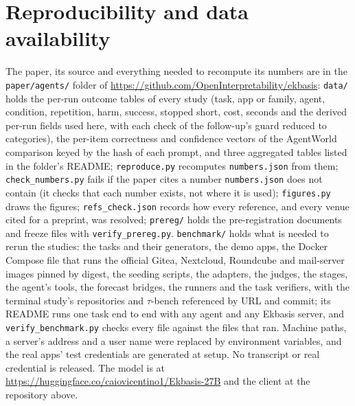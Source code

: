 \documentclass[11pt]{article}
\begin{document}
\section*{Reproducibility and data availability}
The paper, its source and everything needed to recompute its numbers are in the \texttt{paper/agents/} folder of
\url{https://github.com/OpenInterpretability/ekbasis}: \texttt{data/} holds the per-run outcome tables of every study
(task, app or family, agent, condition, repetition, harm, success, stopped short, cost, seconds and the derived per-run
fields used here, with each check of the follow-up's guard reduced to categories), the per-item correctness and
confidence vectors of the AgentWorld comparison keyed by the hash of each prompt, and three aggregated tables listed in
the folder's README; \texttt{reproduce.py} recomputes \texttt{numbers.json} from them; \texttt{check\_numbers.py} fails
if the paper cites a number \texttt{numbers.json} does not contain (it checks that each number exists, not where it is
used); \texttt{figures.py} draws the figures; \texttt{refs\_check.json} records how every reference, and every venue cited
for a preprint, was resolved; \texttt{prereg/} holds the pre-registration documents and freeze files with
\texttt{verify\_prereg.py}. \texttt{benchmark/} holds what is needed to rerun the studies: the tasks and their
generators, the demo apps, the Docker Compose file that runs the official Gitea, Nextcloud, Roundcube and mail-server
images pinned by digest, the seeding scripts, the adapters, the judges, the stages, the agent's tools, the forecast
bridges, the runners and the task verifiers, with the terminal study's repositories and $\tau$-bench referenced by URL
and commit; its README runs one task end to end with any agent and any Ekbasis server, and \texttt{verify\_benchmark.py}
checks every file against the files that ran. Machine paths, a server's address and a user name were replaced by
environment variables, and the real apps' test credentials are generated at setup. No transcript or real credential is
released. The model is at \url{https://huggingface.co/caiovicentino1/Ekbasis-27B} and the client at the repository above.

\appendix
\end{document}

